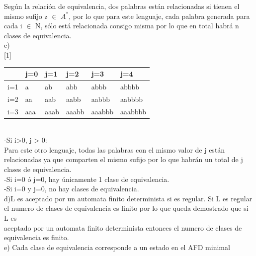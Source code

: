 Según la relación de equivalencia, dos palabras están relacionadas si tienen el mismo sufijo z $\in$ $A^{*}$, por lo que para este lenguaje, cada palabra generada para cada i $\in$ N, sólo está relacionada consigo misma por lo que en total habrá n clases de equivalencia. \\




c) \\
\scalebox{1}[1]{
	\begin{tabular}{|r|l|l|l|l|l|}
		\hline
		&j=0 &j=1 &j=2 &j=3 &j=4\\
		\hline
		i=1& a &ab &abb &abbb &abbbb\\
		\hline
		i=2& aa &aab &aabb &aabbb &aabbbb\\
		\hline
		i=3& aaa& aaab &aaabb &aaabbb &aaabbbb\\
		\hline
	\end{tabular}}\\

-Si i>0, j > 0: \\
Para este otro lenguaje, todas las palabras con el mismo valor de j están relacionadas ya que comparten el mismo sufijo por lo que habrán un total de j clases de equivalencia.
\\ -Si i=0 ó j=0, hay únicamente 1 clase de equivalencia.
\\-Si i=0 y j=0, no hay clases de equivalencia. \\

d)L es aceptado por un automata finito determinista si es regular. Si L es regular el numero de clases de equivalencia es finito por lo que queda demostrado que si L es \\aceptado por un automata finito determinista entonces el numero de clases de \\equivalencia es finito.\\



e) Cada clase de equivalencia corresponde a un estado en el AFD minimal





